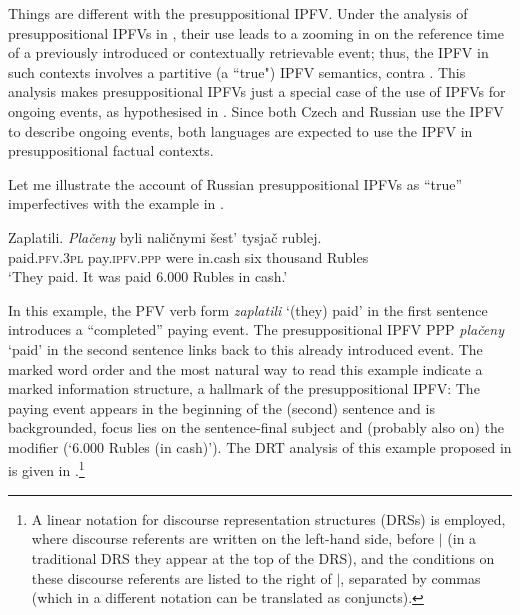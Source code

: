 \documentclass[output=paper,colorlinks,citecolor=brown]{langscibook}
\begin{document}
Things are different with the presuppositional IPFV. Under the analysis of presuppositional IPFVs in \citet{gehrketrueipf}, their use leads to a zooming in on the reference time of a previously introduced or contextually retrievable event; thus, the IPFV in such contexts involves a partitive (a ``true") IPFV semantics, contra \citet{gronn15}. This analysis makes presuppositional IPFVs just a special case of the use of IPFVs for ongoing events, as hypothesised in \citet{gehrke22}. Since both Czech and Russian use the IPFV to describe ongoing events, both languages are expected to use the IPFV in presuppositional factual contexts. 

Let me illustrate the account of Russian presuppositional IPFVs as ``true'' imperfectives with the example in  \citep[adapted from][]{gehrketrueipf}. 

\ea \label{ex:zaplatili}
\gll Zaplatili. \textit{Plačeny} byli naličnymi šest' tysjač rublej.\\
	paid.\textsc{pfv.3pl} pay.\textsc{ipfv.ppp} were in.cash six thousand Rubles\\
\glt	`They paid. It was paid 6.000 Rubles in cash.'
\z 

\noindent In this example, the PFV verb form \textit{zaplatili} `(they) paid' in the first sentence introduces a ``completed'' paying event. The presuppositional IPFV PPP \textit{plačeny} `paid' in the second sentence links back to this already introduced event. The marked word order and the most natural way to read this example indicate a marked information structure, a hallmark of the presuppositional IPFV: The paying event appears in the beginning of the (second) sentence and is backgrounded, focus lies on the sentence-final subject and (probably also on) the modifier (`6.000 Rubles (in cash)'). The DRT analysis \citep[][]{Kamp1993} of this example proposed in \citet{gehrketrueipf} is given in .\footnote{A linear notation for discourse representation structures (DRSs) is employed, where discourse referents are written on the left-hand side, before $|$ (in a traditional DRS they appear at the top of the DRS), and the conditions on these discourse referents are listed to the right of $|$, separated by commas (which in a different notation can be translated as conjuncts).}

\end{document}
